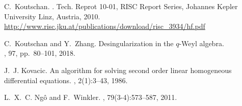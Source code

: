 \documentclass[10pt,a4paper]{article}
\begin{document}
\begin{thebibliography}{10}
C.~Koutschan.
.
\newblock Tech. Reprot 10-01, RISC Report Series, Johannes Kepler University Linz, Austria, 2010. \\
\href{http://www.risc.jku.at/publications/download/risc_3934/hf.pdf}{http:/$\!$/www.risc.jku.at/publications/download/risc\_3934/hf.pdf}



C.~Koutschan and Y.~Zhang.
\newblock Desingularization in the $q$-Weyl algebra. \\
, 97, pp.\ 80–101, 2018. 

J.~J. Kovacic.
\newblock An algorithm for solving second order linear homogeneous differential
  equations.
, 2(1):3--43, 1986.


% 
% 
% 



L.~X.~C. {Ng\^o} and F.~Winkler.
, 79(3-4):573--587, 2011.


\end{thebibliography}
\end{document}
